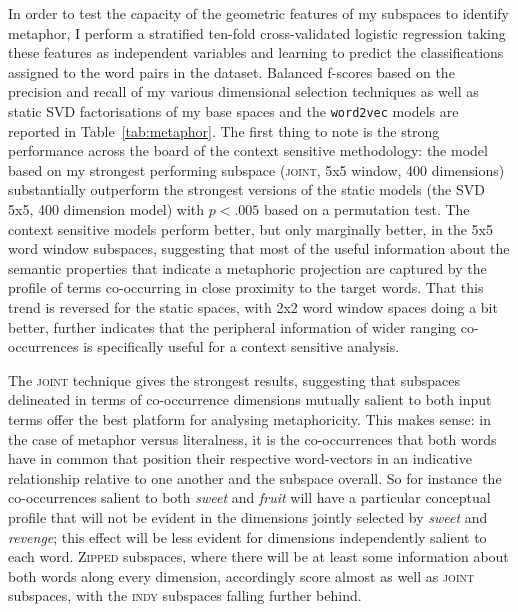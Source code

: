 In order to test the capacity of the geometric features of my subspaces to identify metaphor, I perform a stratified ten-fold cross-validated logistic regression taking these features as independent variables and learning to predict the classifications assigned to the word pairs in the dataset.  Balanced f-scores based on the precision and recall of my various dimensional selection techniques as well as static SVD factorisations of my base spaces and the \texttt{word2vec} models are reported in Table~\ref{tab:metaphor}.  The first thing to note is the strong performance across the board of the context sensitive methodology: the model based on my strongest performing subspace (\textsc{joint}, 5x5 window, 400 dimensions) substantially outperform the strongest versions of the static models (the SVD 5x5, 400 dimension model) with $p < .005$ based on a permutation test.  The context sensitive models perform better, but only marginally better, in the 5x5 word window subspaces, suggesting that most of the useful information about the semantic properties that indicate a metaphoric projection are captured by the profile of terms co-occurring in close proximity to the target words.  That this trend is reversed for the static spaces, with 2x2 word window spaces doing a bit better, further indicates that the peripheral information of wider ranging co-occurrences is specifically useful for a context sensitive analysis.

The \textsc{joint} technique gives the strongest results, suggesting that subspaces delineated in terms of co-occurrence dimensions mutually salient to both input terms offer the best platform for analysing metaphoricity.  This makes sense: in the case of metaphor versus literalness, it is the co-occurrences that both words have in common that position their respective word-vectors in an indicative relationship relative to one another and the subspace overall.  So for instance the co-occurrences salient to both \emph{sweet} and \emph{fruit} will have a particular conceptual profile that will not be evident in the dimensions jointly selected by \emph{sweet} and \emph{revenge}; this effect will be less evident for dimensions independently salient to each word.  \textsc{Zipped} subspaces, where there will be at least some information about both words along every dimension, accordingly score almost as well as \textsc{joint} subspaces, with the \textsc{indy} subspaces falling further behind.

